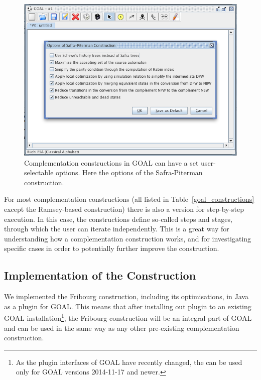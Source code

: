 \begin{figure}
\begin{center}
\includegraphics[scale=0.5]{figures/goal_complementation_options.png}
\caption{Complementation constructions in GOAL can have a set user-selectable options. Here the options of the Safra-Piterman construction.}
\label{goal_complementation_options}
\end{center}
\end{figure}

For most complementation constructions (all listed in Table~\ref{goal_constructions} except the Ramsey-based construction) there is also a version for step-by-step execution. In this case, the constructions define so-called steps and stages, through which the user can iterate independently. This is a great way for understanding how a complementation construction works, and for investigating specific cases in order to potentially further improve the construction. 


\subsection{Implementation of the Construction}
\label{implementation}
We implemented the Fribourg construction, including its optimisations, in Java as a plugin for GOAL. This means that after installing out plugin to an existing GOAL installation\footnote{As the plugin interfaces of GOAL have recently changed, the can be used only for GOAL versions 2014-11-17 and newer.}, the Fribourg construction will be an integral part of GOAL and can be used in the same way as any other pre-existing complementation construction.

